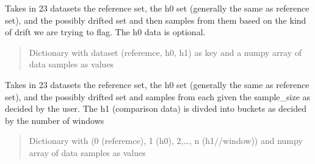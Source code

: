 \documentclass[letterpaper,10pt,english]{sphinxmanual}
\begin{document}
\begin{fulllineitems}
\begin{fulllineitems}
\label{\detokenize{baseModules/sampling:sampling.samplingData.sample_data_gradual}}
\pysigstartsignatures
{}
\pysigstopsignatures
\sphinxAtStartPar
Takes in 2\sphinxhyphen{}3 datasets \sphinxhyphen{} the reference set, the h0 set (generally the same as reference set),
and the possibly drifted set and then samples from them based on the kind of drift we are
trying to flag. The h0 data is optional.
\begin{quote}\begin{description}
\sphinxAtStartPar
Dictionary with dataset (referemce, h0, h1) as key and a numpy array of data samples as values

\end{description}\end{quote}

\end{fulllineitems}


\begin{fulllineitems}
\label{\detokenize{baseModules/sampling:sampling.samplingData.sample_data_online}}
\pysigstartsignatures
{}
\pysigstopsignatures
\sphinxAtStartPar
Takes in 2\sphinxhyphen{}3 datasets \sphinxhyphen{} the reference set, the h0 set (generally the same as reference set),
and the possibly drifted set and samples from each given the sample\_size as decided by the
user. The h1 (comparison data) is divded into buckets as decided by the number of windows
\begin{quote}\begin{description}
\sphinxAtStartPar
Dictionary with (0 (referemce), 1 (h0), 2,…, n (h1//window)) and numpy array of data samples as values

\end{description}\end{quote}

\end{fulllineitems}



\end{fulllineitems}
\end{document}
